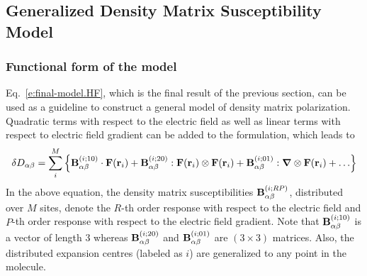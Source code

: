 \documentclass[aip,graphicx]{revtex4-1}
\newcommand{\BM}[1]{\bm{#1}}
\begin{document}
\subsection{Generalized Density Matrix Susceptibility Model}

\subsubsection{Functional form of the model}

Eq.~\eqref{e:final-model.HF}, which is the final result of the previous section, 
can be used as a guideline to construct a general model of density matrix polarization.
Quadratic terms with respect to the electric field as well as linear terms with respect to
electric field gradient can be added to the formulation, which leads to
%
\begin{equation}\label{e:final-model.General}
 \delta D_{\alpha\beta} = \sum_{i }^M \left\{
                                      {\bf B}^{(i ; 10)}_{\alpha\beta} \cdot {\bf F}({\bf r}_i)  
                        +             {\bf B}^{(i ; 20)}_{\alpha\beta} : {\bf F}({\bf r}_i) \otimes {\bf F}({\bf r}_i)
                        +             {\bf B}^{(i ; 01)}_{\alpha\beta} : {\BM\nabla} \otimes {\bf F}({\bf r}_i) 
                        + \ldots \right\}
\end{equation}
%
In the above equation, the density matrix susceptibilities
${\bf B}^{(i; RP)}_{\alpha\beta}$, distributed over $M$ sites,
denote the $R$-th order response with respect to the electric field
and $P$-th order response with respect to the electric field gradient. Note that
${\bf B}^{(i; 10)}_{\alpha\beta}$ is a vector of length $3$ whereas ${\bf B}^{(i; 20)}_{\alpha\beta}$
and ${\bf B}^{(i; 01)}_{\alpha\beta}$ are $(3\times 3)$ matrices. Also, the distributed expansion centres
(labeled as $i$) are generalized to any point in the molecule.
\end{document}
